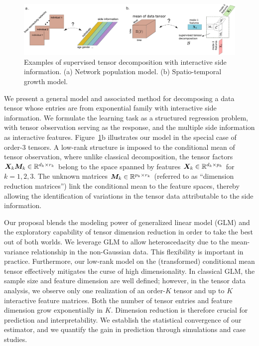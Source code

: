 \documentclass[12pt]{article}
\theoremstyle{definition}
\theoremstyle{definition}
\begin{document}
\begin{figure}[t]
\begin{center}
\includegraphics[width=16cm]{demo.pdf}
\end{center}
\caption{Examples of supervised tensor decomposition with interactive side information. (a) Network population model. (b) Spatio-temporal growth model.} \label{fig:intro1}
\end{figure}

We present a general model and associated method for decomposing a data tensor whose entries are from exponential family with interactive side information. We formulate the learning task as a structured regression problem, with tensor observation serving as the response, and the multiple side information as interactive features. Figure~\ref{fig:intro1}b illustrates our model in the special case of order-3 tensors. A low-rank structure is imposed to the conditional mean of tensor observation, where unlike classical decomposition, the tensor factors $\bm X_k\bm M_k\in\mathbb{R}^{d_k\times r_k}$ belong to the space spanned by features $\bm X_k\in\mathbb{R}^{d_k\times p_k}$ for $k=1,2,3$. The unknown matrices $\bm M_k\in\mathbb{R}^{p_k\times r_k}$ (referred to as ``dimension reduction matrices'') link the conditional mean to the feature spaces, thereby allowing the identification of variations in the tensor data attributable to the side information.


Our proposal blends the modeling power of generalized linear model (GLM) and the exploratory capability of tensor dimension reduction in order to take the best out of both worlds. We leverage GLM to allow heteroscedacity due to the mean-variance relationship in the non-Gaussian data. This flexibility is important in practice. Furthermore, our low-rank model on the (transformed) conditional mean tensor effectively mitigates the curse of high dimensionality. In classical GLM, the sample size and feature dimension are well defined; however, in the tensor data analysis, we observe only one realization of an order-$K$ tensor and up to $K$ interactive feature matrices. Both the number of tensor entries and feature dimension grow exponentially in $K$. Dimension reduction is therefore crucial for prediction and interpretability. We establish the statistical convergence of our estimator, and we quantify the gain in prediction through simulations and case studies. 
 
\end{document}
